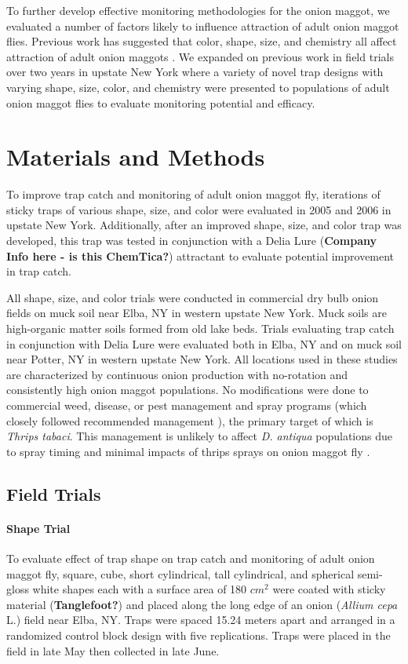 \documentclass[alpha-refs]{wiley-article}
\begin{document}
To further develop effective monitoring methodologies for the onion maggot, we evaluated a number of factors likely to influence attraction of adult onion maggot flies.  Previous work has suggested that color, shape, size, and chemistry all affect attraction of adult onion maggots \citep{harris1983color,harris1988host, thomingdeveloping, otto2000development}. We expanded on previous work in field trials over two years in upstate New York where a variety of novel trap designs with varying shape, size, color, and chemistry were presented to populations of adult onion maggot flies to evaluate monitoring potential and efficacy.  

\section{Materials and Methods}

To improve trap catch and monitoring of adult onion maggot fly, iterations of sticky traps of various shape, size, and color were evaluated in 2005 and 2006 in upstate New York.  Additionally, after an improved shape, size, and color trap was developed, this trap was tested in conjunction with a Delia Lure (\textbf{Company Info here - is this ChemTica?}) attractant to evaluate potential improvement in trap catch.  

All shape, size, and color trials were conducted in commercial dry bulb onion fields on muck soil near Elba, NY in western upstate New York. Muck soils are high-organic matter soils formed from old lake beds.  Trials evaluating trap catch in conjunction with Delia Lure were evaluated both in Elba, NY and on muck soil near Potter, NY in western upstate New York.  All locations used in these studies are characterized by continuous onion production with no-rotation and consistently high onion maggot populations.  No modifications were done to commercial weed, disease, or pest management and spray programs (which closely followed recommended management \citep{reiners2011integrated}), the primary target of which is \textit{Thrips tabaci}.  This management is unlikely to affect \textit{D. antiqua} populations due to spray timing and minimal impacts of thrips sprays on onion maggot fly \citep{finch1986behavior}. 

\subsection{Field Trials}

\paragraph{Shape Trial} To evaluate effect of trap shape on trap catch and monitoring of adult onion maggot fly, square, cube, short cylindrical, tall cylindrical, and spherical semi-gloss white shapes each with a surface area of 180 $cm^2$  were coated with sticky material (\textbf{Tanglefoot?}) and placed along the long edge of an onion (\textit{Allium cepa} L.) field near Elba, NY.  Traps were spaced 15.24 meters apart and arranged in a randomized control block design with five replications.  Traps were placed in the field in late May then collected in late June.   
\end{document}
